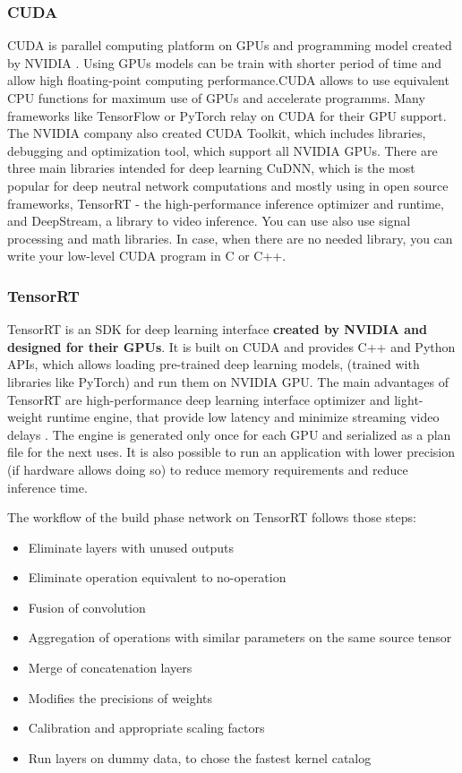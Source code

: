 \documentclass[../Main.tex]{subfiles}
\begin{document}
    \subsubsection{CUDA}
    CUDA is parallel computing platform on GPUs and programming model created by NVIDIA \cite{cudatoolkit}. Using GPUs models can be train with shorter period of time and allow high floating-point computing performance.CUDA allows to use equivalent CPU functions for maximum use of GPUs and accelerate programms. Many frameworks like TensorFlow or PyTorch relay on CUDA for their GPU support. The NVIDIA company also created CUDA Toolkit, which includes libraries, debugging and optimization tool, which support all NVIDIA GPUs. There are three main libraries intended for deep learning CuDNN, which is the most popular for deep neutral network computations and mostly using in open source frameworks, TensorRT - the high-performance inference optimizer and runtime, and DeepStream, a library to video inference. You can use also use signal processing and math libraries. In case, when there are no needed library, you can write your low-level CUDA program in C or C++.  
    
    \subsubsection{TensorRT} \label{trt_chapter}
    TensorRT is an SDK for deep learning interface \textbf{created by NVIDIA and designed for their GPUs}. It is built on CUDA and provides C++ and Python APIs, which allows loading pre-trained deep learning models, (trained with libraries like PyTorch) and run them on NVIDIA GPU. The main advantages of TensorRT are high-performance deep learning interface optimizer and light-weight runtime engine, that provide low latency and minimize streaming video delays \cite{tensorrtdocs}. The engine is generated only once for each GPU and serialized as a plan file for the next uses. It is also possible to run an application with lower precision (if hardware allows doing so) to reduce memory requirements and reduce inference time. 
    
    The workflow of the build phase network on TensorRT follows those steps:
    \begin{itemize}
        \item Eliminate layers with unused outputs
        \item Eliminate operation equivalent to no-operation
        \item Fusion of convolution
        \item Aggregation of operations with similar parameters on the same source tensor 
        \item Merge of concatenation layers
        \item Modifies the precisions of weights 
        \item Calibration and appropriate scaling factors
        \item Run layers on dummy data, to chose the fastest kernel catalog
    \end{itemize}
    
\end{document}
